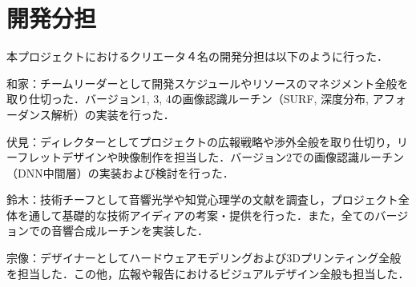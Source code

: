 \section{開発分担}%
本プロジェクトにおけるクリエータ４名の開発分担は以下のように行った．

和家：チームリーダーとして開発スケジュールやリソースのマネジメント全般を取り仕切った．バージョン1, 3, 4の画像認識ルーチン（SURF, 深度分布, アフォーダンス解析）の実装を行った．

伏見：ディレクターとしてプロジェクトの広報戦略や渉外全般を取り仕切り，リーフレットデザインや映像制作を担当した．バージョン2での画像認識ルーチン（DNN中間層）の実装および検討を行った．

鈴木：技術チーフとして音響光学や知覚心理学の文献を調査し，プロジェクト全体を通して基礎的な技術アイディアの考案・提供を行った．また，全てのバージョンでの音響合成ルーチンを実装した．

宗像：デザイナーとしてハードウェアモデリングおよび3Dプリンティング全般を担当した．この他，広報や報告におけるビジュアルデザイン全般も担当した．

